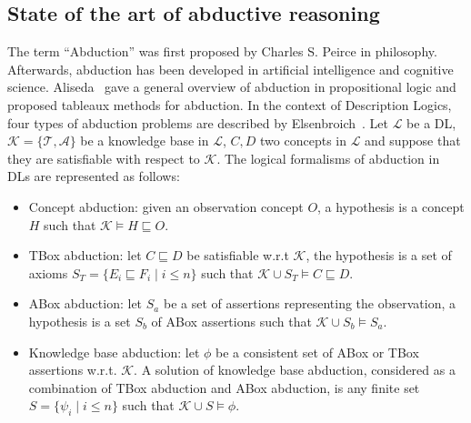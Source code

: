 \documentclass{article}
\begin{document}
\subsection{State of the art of abductive reasoning}
The term ``Abduction'' was first proposed by Charles S. Peirce in philosophy.
Afterwards, abduction has been developed in artificial intelligence and cognitive science.
Aliseda~\cite{aliseda1997seeking} gave a general overview of abduction in propositional logic and proposed tableaux methods for abduction.
In the context of Description Logics, four types of abduction problems  are described by Elsenbroich~\cite{elsenbroich2006case}.
Let $\mathcal{L}$ be a DL, $\mathcal{K}=\{\mathcal{T},\mathcal{A}\}$ be a knowledge base in $\mathcal{L}$, $C,D$ two concepts in $\mathcal{L}$ and suppose that they are satisfiable
with respect to  $\mathcal{K}$.
The logical formalisms of abduction in DLs are represented as follows:
\begin{itemize}
 \item Concept abduction: given an observation concept $O$, a hypothesis is a concept $H$ such that $\mathcal{K}\vDash H \sqsubseteq O$.
 \item TBox abduction: let $C\sqsubseteq D$ be satisfiable w.r.t $\mathcal{K}$, the hypothesis is a set of axioms $S_T=\{E_i\sqsubseteq F_i \mid i\leq n\}$
 such that $ \mathcal{K}\cup S_T\vDash C\sqsubseteq D$.
 \item ABox abduction: let $S_a$ be a set of assertions representing the observation, a hypothesis is a set $S_b$ of ABox assertions such that $\mathcal{K} \cup S_b\vDash S_a$.
 \item Knowledge base abduction: let $\phi$ be a consistent set of ABox or TBox assertions w.r.t. $\mathcal{K}$. A solution of knowledge base abduction, considered 
 as a combination of TBox abduction and ABox abduction, is any finite set $S=\{\psi_i \mid i\leq n\}$ such that $ \mathcal{K} \cup S \vDash \phi$.
\end{itemize}
\end{document}
